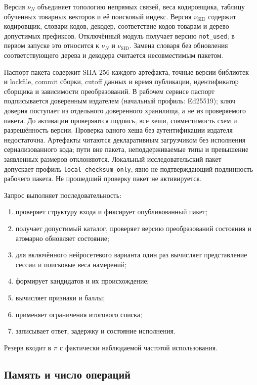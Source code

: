 \documentclass[12pt,a4paper]{article}
\newcommand{\code}[1]{{\ttfamily\small\nolinkurl{#1}}}
\theoremstyle{plainru}
\begin{document}
Версия $\nu_N$ объединяет топологию непрямых связей, веса кодировщика,
таблицу обученных товарных векторов и её поисковый индекс.
Версия $\nu_{\mathrm{SID}}$ содержит кодировщик, словари кодов,
декодер, соответствие кодов товарам и дерево допустимых префиксов.
Отключённый модуль получает версию \code{not_used};
в первом запуске это относится к $\nu_N$ и $\nu_{\mathrm{SID}}$.
Замена словаря без обновления соответствующего дерева
и декодера считается несовместимым пакетом.

Паспорт пакета содержит SHA-256 каждого артефакта, точные версии
библиотек и lockfile, commit сборки, cutoff данных и время публикации,
идентификатор сборщика и зависимости преобразований. В рабочем сервисе
паспорт подписывается доверенным издателем (начальный профиль:
Ed25519); ключ доверия поступает из отдельного доверенного хранилища,
а не из проверяемого пакета. До активации проверяются подпись,
все хеши, совместимость схем и разрешённость версии. Проверка одного
хеша без аутентификации издателя недостаточна. Артефакты читаются
декларативным загрузчиком без исполнения сериализованного кода;
пути вне пакета, неподдерживаемые типы и превышение заявленных
размеров отклоняются. Локальный исследовательский пакет допускает
профиль \code{local_checksum_only}, явно не подтверждающий
подлинность рабочего пакета. Не прошедший проверку пакет не активируется.

Запрос выполняет последовательность:
\begin{enumerate}
\item проверяет структуру входа и фиксирует опубликованный пакет;
\item получает допустимый каталог, проверяет версию преобразований
состояния и атомарно обновляет состояние;
\item для включённого нейросетевого варианта один раз вычисляет
представление сессии и поисковые веса намерений;
\item формирует кандидатов и их происхождение;
\item вычисляет признаки и баллы;
\item применяет ограничения итогового списка;
\item записывает ответ, задержку и состояние исполнения.
\end{enumerate}
Резерв входит в \(\pi\) с фактически наблюдаемой частотой использования.

\subsection{Память и число операций}
\end{document}
